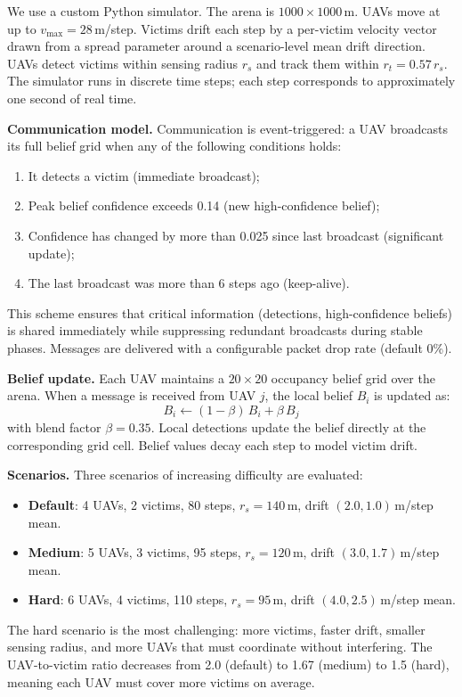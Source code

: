 \documentclass[journal]{IEEEtran}
\begin{document}
We use a custom Python simulator. The arena is $1000 \times 1000$\,m. UAVs move at
up to $v_{\max} = 28$\,m/step. Victims drift each step by a per-victim velocity
vector drawn from a spread parameter around a scenario-level mean drift direction.
UAVs detect victims within sensing radius $r_s$ and track them within
$r_t = 0.57\,r_s$. The simulator runs in discrete time steps; each step corresponds
to approximately one second of real time.

\textbf{Communication model.} Communication is event-triggered: a UAV broadcasts its
full belief grid when any of the following conditions holds:
\begin{enumerate}
  \item[(a)] It detects a victim (immediate broadcast);
  \item[(b)] Peak belief confidence exceeds 0.14 (new high-confidence belief);
  \item[(c)] Confidence has changed by more than 0.025 since last broadcast (significant update);
  \item[(d)] The last broadcast was more than 6 steps ago (keep-alive).
\end{enumerate}
This scheme ensures that critical information (detections, high-confidence beliefs)
is shared immediately while suppressing redundant broadcasts during stable phases.
Messages are delivered with a configurable packet drop rate (default 0\%).

\textbf{Belief update.} Each UAV maintains a $20 \times 20$ occupancy belief grid
over the arena. When a message is received from UAV $j$, the local belief $B_i$ is
updated as:
\begin{equation}
  B_i \leftarrow (1 - \beta)\,B_i + \beta\,B_j
  \label{eq:belief_update}
\end{equation}
with blend factor $\beta = 0.35$. Local detections update the belief directly at the
corresponding grid cell. Belief values decay each step to model victim drift.

\textbf{Scenarios.} Three scenarios of increasing difficulty are evaluated:
\begin{itemize}
  \item \textbf{Default}: 4 UAVs, 2 victims, 80 steps, $r_s = 140$\,m,
        drift $(2.0, 1.0)$\,m/step mean.
  \item \textbf{Medium}: 5 UAVs, 3 victims, 95 steps, $r_s = 120$\,m,
        drift $(3.0, 1.7)$\,m/step mean.
  \item \textbf{Hard}: 6 UAVs, 4 victims, 110 steps, $r_s = 95$\,m,
        drift $(4.0, 2.5)$\,m/step mean.
\end{itemize}
The hard scenario is the most challenging: more victims, faster drift, smaller sensing
radius, and more UAVs that must coordinate without interfering. The UAV-to-victim
ratio decreases from 2.0 (default) to 1.67 (medium) to 1.5 (hard), meaning each UAV
must cover more victims on average.
\end{document}
